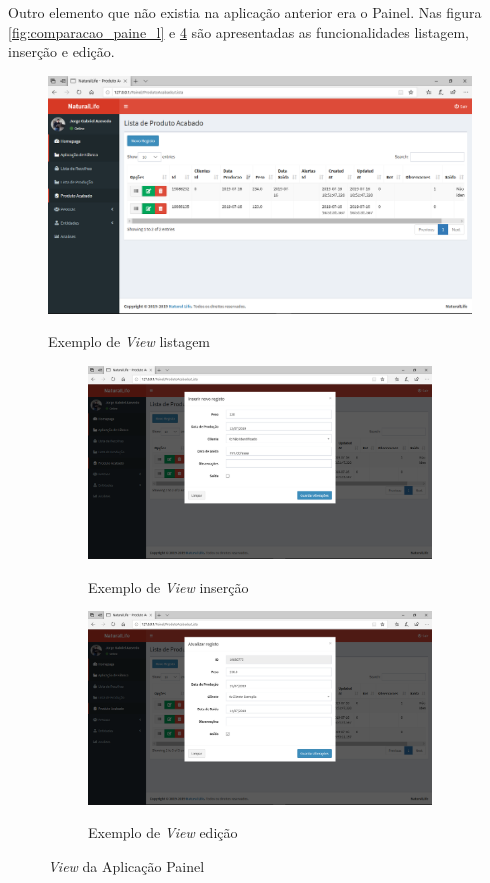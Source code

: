 Outro elemento que não existia na aplicação anterior era o Painel. Nas figura \ref{fig:comparacao_paine_l} e \ref{fig:comparacao_painel} são apresentadas as funcionalidades listagem, inserção e edição.
\begin{figure}[H]
	\centering
	
	\includegraphics[width=0.7\linewidth]{figuras/AppPhp/8-lista.png}
	\label{fig:comparacao_painel_l}
	\caption{Exemplo de \textit{View} listagem}

\end{figure}
\begin{figure}[H]
	\centering
	\begin{subfigure}[t]{0.45\linewidth}
		\includegraphics[width=\linewidth]{figuras/AppPhp/9-novo.png}
		\label{fig:comparacao_painel_1}
		\caption{Exemplo de \textit{View} inserção}
	\end{subfigure}
	\begin{subfigure}[t]{0.45\linewidth}
		\includegraphics[width=\linewidth]{figuras/AppPhp/10-editar.png}
		\label{fig:comparacao_painel_2}
		\caption{Exemplo de \textit{View} edição}
	\end{subfigure}
	
	\caption{\textit{View} da Aplicação Painel}
	\label{fig:comparacao_painel}
\end{figure}

